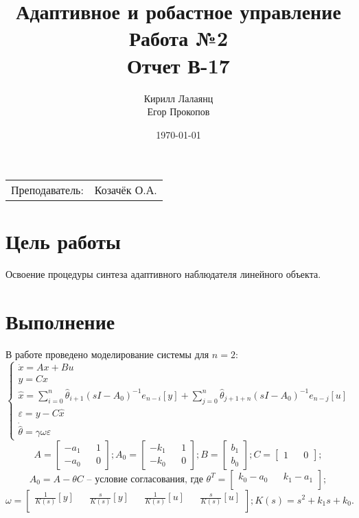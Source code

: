 \documentclass{article}
\title{Адаптивное и робастное управление \\ Работа №2 \\ Отчет В-17} %
\author{Кирилл Лалаянц \\ Егор Прокопов} %
\date{\today} %
\begin{document}
\maketitle %

\begin{center}
\begin{tabular}{l r}
Преподаватель: & Козачёк О.А. %
\end{tabular}
\end{center}
\newpage

\section{Цель работы}

Освоение процедуры синтеза адаптивного наблюдателя
линейного объекта.

\section{Выполнение}
В работе проведено моделирование системы для \(n = 2\):
\[
\begin{cases}
    \dot x = A x + Bu \\
    y = C x \\
    \hat x = \sum_{i=0}^{n}\hat \theta_{i+1} (sI - A_0)^{-1} e_{n-i} [y] + \sum_{j=0}^{n}\hat \theta_{j + 1 + n} (sI - A_0)^{-1} e_{n - j} [u] \\
    \varepsilon = y - C \hat x  \\ 
    \dot {\hat \theta} = \gamma \omega \varepsilon
\end{cases}
\]
\[
  A = \begin{bmatrix}
    -a_1 && 1\\
    -a_0 && 0
  \end{bmatrix};
  A_0 = \begin{bmatrix}
    -k_1 && 1\\
    -k_0 && 0
  \end{bmatrix};
  B = \begin{bmatrix}
    b_1 \\
    b_0
  \end{bmatrix};
  C = \begin{bmatrix}
    1 && 0
  \end{bmatrix};
\]
\[
A_0 = A - \theta C \text{ -- условие согласования, где } 
\theta ^ T= \begin{bmatrix}
  k_0 - a_0 && k_1 - a_1\\
\end{bmatrix};
\]
\[
  \omega = \begin{bmatrix}
    \frac{1}{K(s)}[y] && \frac{s}{K(s)}[y] && \frac{1}{K(s)}[u] && \frac{s}{K(s)}[u]\\
  \end{bmatrix};
K(s) = s^2 + k_1 s + k_0 .\]
\end{document}

